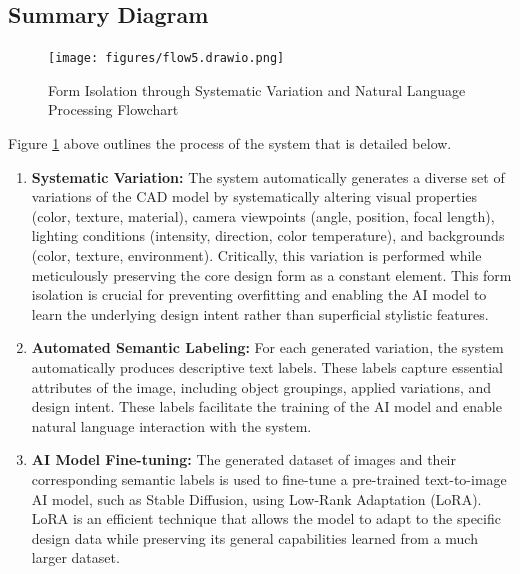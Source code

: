 \documentclass[12pt]{article}
\begin{document}
\subsection{Summary Diagram}
\begin{figure}[H]
    \centering
    \texttt{[image: figures/flow5.drawio.png]}
    \caption{Form Isolation through Systematic Variation and Natural Language Processing Flowchart}
    \label{fig:firstflowchart}
\end{figure}



Figure \ref{fig:firstflowchart} above outlines the process of the system that is detailed below.

\begin{enumerate}
    \item \textbf{Systematic Variation:} The system automatically generates a diverse set of variations of the CAD model by systematically altering visual properties (color, texture, material), camera viewpoints (angle, position, focal length), lighting conditions (intensity, direction, color temperature), and backgrounds (color, texture, environment). Critically, this variation is performed while meticulously preserving the core design form as a constant element. This form isolation is crucial for preventing overfitting and enabling the AI model to learn the underlying design intent rather than superficial stylistic features.

    \item \textbf{Automated Semantic Labeling:} For each generated variation, the system automatically produces descriptive text labels. These labels capture essential attributes of the image, including object groupings, applied variations, and design intent. These labels facilitate the training of the AI model and enable natural language interaction with the system. 

    \item \textbf{AI Model Fine-tuning:} The generated dataset of images and their corresponding semantic labels is used to fine-tune a pre-trained text-to-image AI model, such as Stable Diffusion, using Low-Rank Adaptation (LoRA). LoRA is an efficient technique that allows the model to adapt to the specific design data while preserving its general capabilities learned from a much larger dataset. 


\end{enumerate}
\end{document}
